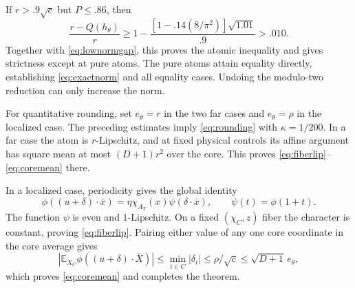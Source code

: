 \documentclass[11pt]{article}
\newcommand{\E}{\mathbb E}
\begin{document}
If $r>.9\sqrt c$ but $P\le.86$, then
\[
 \frac{r-Q(h_\theta)}r
 \ge1-\frac{[1-.14(8/\pi^2)]\sqrt{1.01}}{.9}>.010.
\]
Together with \eqref{eq:lownormgap}, this proves the atomic inequality
and gives strictness except at pure atoms. The pure atoms attain
equality directly, establishing \eqref{eq:exactnorm} and all equality
cases. Undoing the modulo-two reduction can only increase the norm.

For quantitative rounding, set $e_\theta=r$ in the two far cases
and $e_\theta=\rho$ in the localized case. The preceding estimates
imply \eqref{eq:rounding} with $\kappa=1/200$. In a far case the atom
is $r$-Lipschitz, and at fixed physical controls its affine argument
has square mean at most $(D+1)r^2$ over the core. This proves
\eqref{eq:fiberlip}--\eqref{eq:coremean} there.

In a localized case, periodicity gives the global identity
\[
 \phi((u+\delta)\cdot\bar x)
    =\eta\chi_{A_T}(x)\psi(\delta\cdot\bar x),
 \qquad \psi(t)=\phi(1+t).
\]
The function $\psi$ is even and $1$-Lipschitz. On a fixed
$(\chi_C,z)$ fiber the character is constant, proving
\eqref{eq:fiberlip}. Pairing either value of any one core coordinate
in the core average gives
\[
 |\E_{X_C}\phi((u+\delta)\cdot\bar X)|
       \le\min_{i\in C}|\delta_i|
       \le\rho/\sqrt c\le\sqrt{D+1}\,e_\theta,
\]
which proves \eqref{eq:coremean} and completes the theorem.
\end{document}
